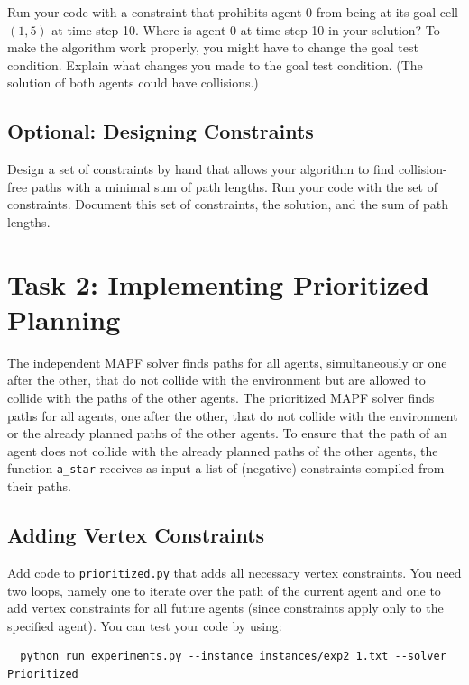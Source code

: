 \documentclass[11pt]{article}
\begin{document}
Run your code with a constraint that prohibits agent 0 from being at its goal cell $(1,5)$ at time step 10. Where is agent 0 at time step 10 in your solution? To make the algorithm work properly, you might have to change the goal test condition. Explain what changes you made to the goal test condition. (The solution of both agents could have collisions.)
 
\subsection{Optional: Designing Constraints}

Design a set of constraints by hand that allows your algorithm to find collision-free paths with a minimal sum of path lengths. Run your code with the set of constraints. Document this set of constraints, the solution, and the sum of path lengths.

\section{Task 2: Implementing Prioritized Planning}

The independent MAPF solver finds paths for all agents, simultaneously or one after the other, that do not collide with the environment but are allowed to collide with the paths of the other agents. The prioritized MAPF solver finds paths for all agents, one after the other, that do not collide with the environment or the already planned paths of the other agents. To ensure that the path of an agent does not collide with the already planned paths of the other agents, the function \texttt{a_star} receives as input a list of (negative) constraints compiled from their paths.

\subsection{Adding Vertex Constraints}

Add code to \texttt{prioritized.py} that adds all necessary vertex constraints. You need two loops, namely one to iterate over the path of the current agent and one to add vertex constraints for all future agents (since constraints apply only to the specified agent). You can test your code by using:

\begin{verbatim}
  python run_experiments.py --instance instances/exp2_1.txt --solver Prioritized
\end{verbatim}
\end{document}
